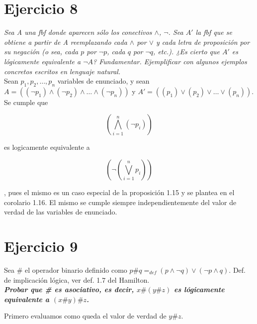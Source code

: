 \documentclass[osajnl,twocolumn,showpacs,superscriptaddress,10pt]{revtex4-1} %
\begin{document}
\section{Ejercicio 8}

\textit{Sea A una fbf donde aparecen sólo los conectivos $\wedge$, $\neg$. Sea $A'$ la fbf que se obtiene a partir de A reemplazando cada $\wedge$ por $\vee$ y cada letra de proposición por su negación (o sea, cada $p$ por $\neg p$, cada $q$ por $\neg q$, etc.). ¿Es cierto que $A'$ es lógicamente equivalente a $\neg A$? Fundamentar. Ejemplificar con algunos ejemplos concretos escritos en lenguaje natural.} \\

Sean $p_1, p_2, \ldots, p_n$ variables de enunciado, y sean $A = ((\neg p_1) \wedge (\neg p_2) \wedge \ldots \wedge (\neg p_n))$ y $A' = ((p_1) \vee (p_2) \vee \ldots \vee (p_n))$. Se cumple que

\begin{equation}
  \left(\bigwedge_{i=1}^{n}{(\neg p_i)}\right)
\end{equation}

es logicamente equivalente a

\begin{equation}
  \left(\neg \left(\bigvee_{i=1}^{n}{p_i}\right)\right)
\end{equation}

, pues el mismo es un caso especial de la proposición 1.15 y se plantea en el corolario 1.16. El mismo se cumple siempre independientemente del valor de verdad de las variables de enunciado. \\

\newpage

\section{Ejercicio 9}

Sea \# el operador binario definido como $p\#q {=}_{def} (p \wedge \neg q) \vee (\neg p \wedge q)$. Def. de implicación lógica, ver def. 1.7 del Hamilton. \\

\textbf{\textit{Probar que \# es asociativo, es decir, $x\#(y\#z)$ es lógicamente equivalente a $(x\#y)\#z$.}}

Primero evaluamos como queda el valor de verdad de $y\#z$.
\end{document}
